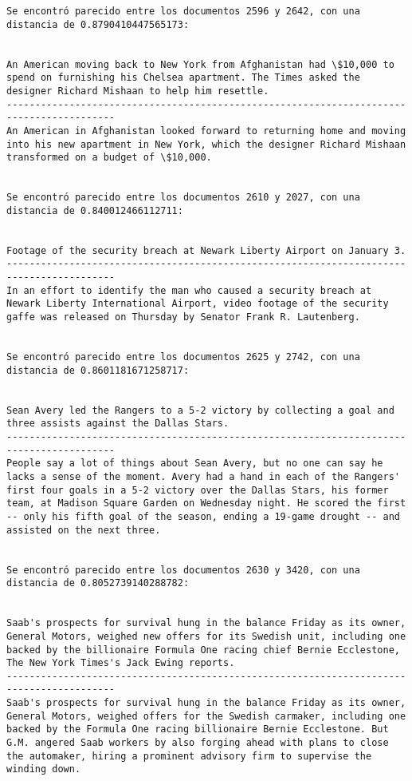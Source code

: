 \documentclass[11pt]{article}
\begin{document}
\begin{Verbatim}[commandchars=\\\{\}]
Se encontró parecido entre los documentos 2596 y 2642, con una distancia de 0.8790410447565173:


An American moving back to New York from Afghanistan had \$10,000 to spend on furnishing his Chelsea apartment. The Times asked the designer Richard Mishaan to help him resettle. 
-----------------------------------------------------------------------------------------
An American in Afghanistan looked forward to returning home and moving into his new apartment in New York, which the designer Richard Mishaan transformed on a budget of \$10,000.


Se encontró parecido entre los documentos 2610 y 2027, con una distancia de 0.840012466112711:


Footage of the security breach at Newark Liberty Airport on January 3.
-----------------------------------------------------------------------------------------
In an effort to identify the man who caused a security breach at Newark Liberty International Airport, video footage of the security gaffe was released on Thursday by Senator Frank R. Lautenberg.


Se encontró parecido entre los documentos 2625 y 2742, con una distancia de 0.8601181671258717:


Sean Avery led the Rangers to a 5-2 victory by collecting a goal and three assists against the Dallas Stars.
-----------------------------------------------------------------------------------------
People say a lot of things about Sean Avery, but no one can say he lacks a sense of the moment. Avery had a hand in each of the Rangers' first four goals in a 5-2 victory over the Dallas Stars, his former team, at Madison Square Garden on Wednesday night. He scored the first -- only his fifth goal of the season, ending a 19-game drought -- and assisted on the next three.


Se encontró parecido entre los documentos 2630 y 3420, con una distancia de 0.8052739140288782:


Saab's prospects for survival hung in the balance Friday as its owner, General Motors, weighed new offers for its Swedish unit, including one backed by the billionaire Formula One racing chief Bernie Ecclestone, The New York Times's Jack Ewing reports.
-----------------------------------------------------------------------------------------
Saab's prospects for survival hung in the balance Friday as its owner, General Motors, weighed offers for the Swedish carmaker, including one backed by the Formula One racing billionaire Bernie Ecclestone. But G.M. angered Saab workers by also forging ahead with plans to close the automaker, hiring a prominent advisory firm to supervise the winding down.



\end{Verbatim}
\end{document}
